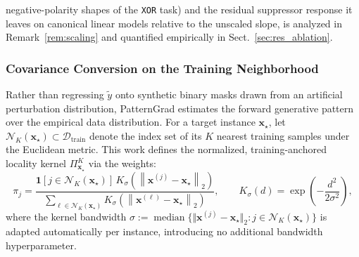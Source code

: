 \documentclass[pdflatex,sn-mathphys-num]{sn-jnl}
\theoremstyle{thmstyleone}
\theoremstyle{thmstyletwo}%
\theoremstyle{thmstylethree}%
\begin{document}
negative-polarity shapes of the \texttt{XOR} task) and the residual suppressor response it leaves on canonical linear models relative to the unscaled slope, is analyzed in Remark~\ref{rem:scaling} and quantified empirically in Sect.~\ref{sec:res_ablation}.

\subsubsection{Covariance Conversion on the Training Neighborhood}\label{sec:pg_covariance}
Rather than regressing $\tilde{y}$ onto synthetic binary masks drawn from an artificial perturbation distribution, PatternGrad estimates the forward generative pattern over the empirical data distribution. For a target instance $\mathbf{x}_\star$, let $\mathcal{N}_K(\mathbf{x}_\star) \subset \mathcal{D}_{\text{train}}$ denote the index set of its $K$ nearest training samples under the Euclidean metric. This work defines the normalized, training-anchored locality kernel $\Pi^K_{\mathbf{x}_\star}$ via the weights:
\begin{equation}
    \pi_j = \frac{\mathbf{1}\!\left[j \in \mathcal{N}_K(\mathbf{x}_\star)\right] \, K_\sigma\!\left(\left\|\mathbf{x}^{(j)} - \mathbf{x}_\star\right\|_2\right)}{\sum_{\ell \in \mathcal{N}_K(\mathbf{x}_\star)} K_\sigma\!\left(\left\|\mathbf{x}^{(\ell)} - \mathbf{x}_\star\right\|_2\right)}, \qquad K_\sigma(d) = \exp\!\left(-\frac{d^2}{2\sigma^2}\right),
    \label{eq:pg_kernel}
\end{equation}
where the kernel bandwidth $\sigma \mathrel{:=} \operatorname{median}\{\Vert\mathbf{x}^{(j)} - \mathbf{x}_\star\Vert_2 : j \in \mathcal{N}_K(\mathbf{x}_\star)\}$ is adapted automatically per instance, introducing no additional bandwidth hyperparameter. 
\end{document}
